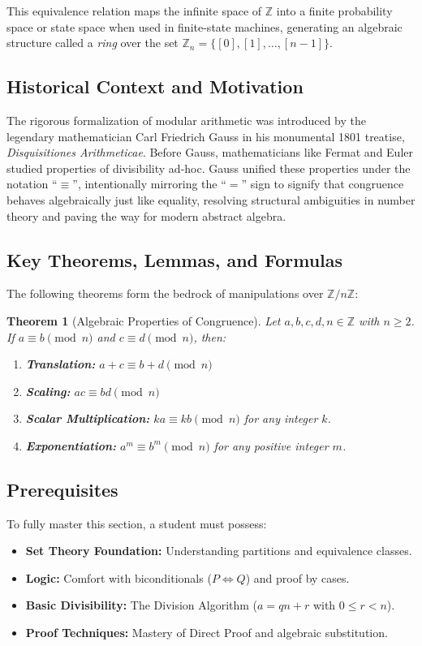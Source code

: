 \documentclass[11pt]{article}
\newtheorem{theorem}{Theorem}[section]
\begin{document}
This equivalence relation maps the infinite space of $\mathbb{Z}$ into a finite probability space or state space when used in finite-state machines, generating an algebraic structure called a \textit{ring} over the set $\mathbb{Z}_n = \{[0], [1], \dots, [n-1]\}$.

\subsection{Historical Context and Motivation}
The rigorous formalization of modular arithmetic was introduced by the legendary mathematician Carl Friedrich Gauss in his monumental 1801 treatise, \textit{Disquisitiones Arithmeticae}. Before Gauss, mathematicians like Fermat and Euler studied properties of divisibility ad-hoc. Gauss unified these properties under the notation ``$\equiv$'', intentionally mirroring the ``$=$'' sign to signify that congruence behaves algebraically just like equality, resolving structural ambiguities in number theory and paving the way for modern abstract algebra.

\subsection{Key Theorems, Lemmas, and Formulas}
The following theorems form the bedrock of manipulations over $\mathbb{Z} / n\mathbb{Z}$:

\begin{theorem}[Algebraic Properties of Congruence]
Let $a, b, c, d, n \in \mathbb{Z}$ with $n \ge 2$. If $a \equiv b \pmod n$ and $c \equiv d \pmod n$, then:
\begin{enumerate}
    \item \textbf{Translation:} $a + c \equiv b + d \pmod n$
    \item \textbf{Scaling:} $ac \equiv bd \pmod n$
    \item \textbf{Scalar Multiplication:} $ka \equiv kb \pmod n$ for any integer $k$.
    \item \textbf{Exponentiation:} $a^m \equiv b^m \pmod n$ for any positive integer $m$.
\end{enumerate}
\end{theorem}

\subsection{Prerequisites}
To fully master this section, a student must possess:
\begin{itemize}
    \item \textbf{Set Theory Foundation:} Understanding partitions and equivalence classes.
    \item \textbf{Logic:} Comfort with biconditionals ($P \iff Q$) and proof by cases.
    \item \textbf{Basic Divisibility:} The Division Algorithm ($a = qn + r$ with $0 \le r < n$).
    \item \textbf{Proof Techniques:} Mastery of Direct Proof and algebraic substitution.
\end{itemize}
\end{document}
